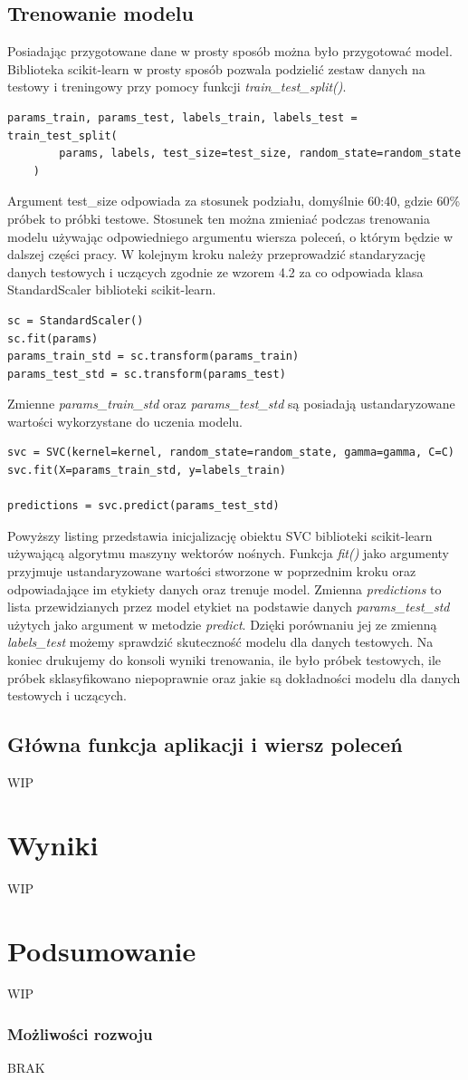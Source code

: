 \documentclass[printmode, eng, openany]{mgr}
\newcommand\tab[1][1cm]{\hspace*{#1}}
\begin{document}
\section{Trenowanie modelu}
\tab Posiadając przygotowane dane w prosty sposób można było przygotować model. Biblioteka scikit-learn w prosty sposób pozwala podzielić zestaw danych na testowy i treningowy przy pomocy funkcji \textit{train\_test\_split()}.
\begin{lstlisting}
params_train, params_test, labels_train, labels_test = train_test_split(
        params, labels, test_size=test_size, random_state=random_state
    )
\end{lstlisting}
\tab Argument test\_size odpowiada za stosunek podziału, domyślnie 60:40, gdzie 60\% próbek to próbki testowe. Stosunek ten można zmieniać podczas trenowania modelu używając odpowiedniego argumentu wiersza poleceń, o którym będzie w dalszej części pracy. W kolejnym kroku należy przeprowadzić standaryzację danych testowych i uczących zgodnie ze wzorem 4.2 za co odpowiada klasa StandardScaler biblioteki scikit-learn.
\begin{lstlisting}
sc = StandardScaler()
sc.fit(params)
params_train_std = sc.transform(params_train)
params_test_std = sc.transform(params_test)
\end{lstlisting}
\tab Zmienne \textit{params\_train\_std} oraz \textit{params\_test\_std} są posiadają ustandaryzowane wartości wykorzystane do uczenia modelu.

\begin{lstlisting}
svc = SVC(kernel=kernel, random_state=random_state, gamma=gamma, C=C)
svc.fit(X=params_train_std, y=labels_train)
    
predictions = svc.predict(params_test_std)
\end{lstlisting}
\tab Powyższy listing przedstawia inicjalizację obiektu SVC biblioteki scikit-learn używającą algorytmu maszyny wektorów nośnych. Funkcja \textit{fit()} jako argumenty przyjmuje ustandaryzowane wartości stworzone w poprzednim kroku oraz odpowiadające im etykiety danych oraz trenuje model. Zmienna \textit{predictions} to lista przewidzianych przez model etykiet na podstawie danych \textit{params\_test\_std} użytych jako argument w metodzie \textit{predict}. Dzięki porównaniu jej ze zmienną \textit{labels\_test} możemy sprawdzić skuteczność modelu dla danych testowych. Na koniec drukujemy do konsoli wyniki trenowania, ile było próbek testowych, ile próbek sklasyfikowano niepoprawnie oraz jakie są dokładności modelu dla danych testowych i uczących.
\section{Główna funkcja aplikacji i wiersz poleceń}
WIP
\chapter{Wyniki}
WIP
\chapter{Podsumowanie}
WIP
\subsection{Możliwości rozwoju}
BRAK
\end{document}
